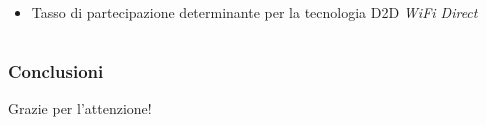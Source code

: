 \documentclass{beamer}
\begin{document}
\begin{frame}[shrink=50]
\begin{columns}
\begin{column}{0.45\textwidth}
\begin{figure}
    \end{figure}
    \begin{itemize}
      \item  Tasso di partecipazione determinante per la tecnologia D2D \textit{WiFi Direct}
    \end{itemize}
  \end{column}
\end{columns}
\end{frame}


\begin{frame}
\frametitle{Conclusioni}
\end{frame}

\begin{frame}
\Huge{\centerline{Grazie per l'attenzione!}}
\end{frame}

\end{document}
